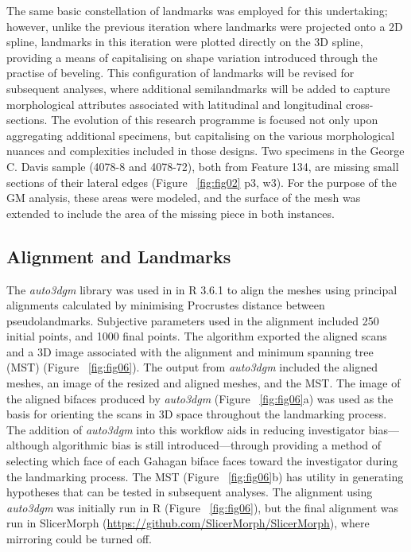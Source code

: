 \documentclass[review]{elsarticle}
\begin{document}
The same basic constellation of landmarks was employed for this undertaking; however, unlike the previous iteration where landmarks were projected onto a 2D spline, landmarks in this iteration were plotted directly on the 3D spline, providing a means of capitalising on shape variation introduced through the practise of beveling. This configuration of landmarks will be revised for subsequent analyses, where additional semilandmarks will be added to capture morphological attributes associated with latitudinal and longitudinal cross-sections. The evolution of this research programme is focused not only upon aggregating additional specimens, but capitalising on the various morphological nuances and complexities included in those designs. Two specimens in the George C. Davis sample (4078-8 and 4078-72), both from Feature 134, are missing small sections of their lateral edges (Figure ~\ref{fig:fig02} p3, w3). For the purpose of the GM analysis, these areas were modeled, and the surface of the mesh was extended to include the area of the missing piece in both instances.

\subsection*{Alignment and Landmarks}

The \textit{auto3dgm} library \citep{RN20822} was used in in R 3.6.1 \citep{R} to align the meshes using principal alignments calculated by minimising Procrustes distance between pseudolandmarks. Subjective parameters used in the alignment included 250 initial points, and 1000 final points. The algorithm exported the aligned scans and a 3D image associated with the alignment and minimum spanning tree (MST) (Figure ~\ref{fig:fig06}). The output from \textit{auto3dgm} included the aligned meshes, an image of the resized and aligned meshes, and the MST. The image of the aligned bifaces produced by \textit{auto3dgm} (Figure ~\ref{fig:fig06}a) was used as the basis for orienting the scans in 3D space throughout the landmarking process. The addition of \textit{auto3dgm} into this workflow aids in reducing investigator bias---although algorithmic bias is still introduced---through providing a method of selecting which face of each Gahagan biface faces toward the investigator during the landmarking process. The MST (Figure ~\ref{fig:fig06}b) has utility in generating hypotheses that can be tested in subsequent analyses. The alignment using \textit{auto3dgm} was initially run in R (Figure ~\ref{fig:fig06}), but the final alignment was run in SlicerMorph (\href{https://github.com/SlicerMorph/SlicerMorph}{https://github.com/SlicerMorph/SlicerMorph}), where mirroring could be turned off.
\end{document}

